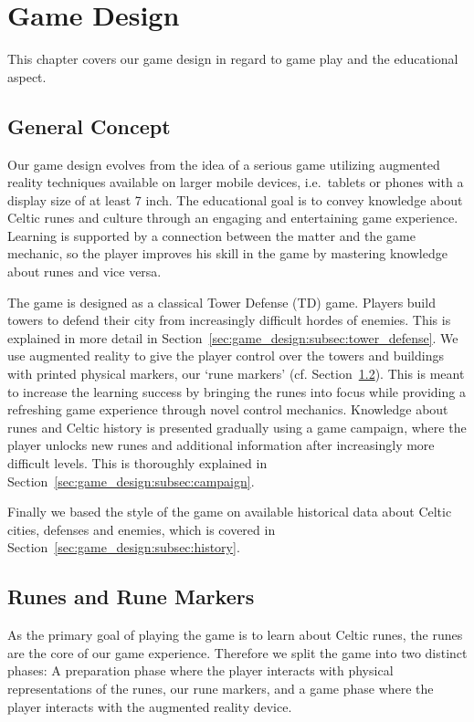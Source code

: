 \section{Game Design}
\label{sec:game_design}

This chapter covers our game design in regard to game play and the educational aspect.

\subsection{General Concept}
\label{sec:game_design:subsec:general_concept}

Our game design evolves from the idea of a serious game utilizing augmented reality techniques available on larger mobile devices, i.e.\ tablets or phones with a display size of at least 7 inch.
The educational goal is to convey knowledge about Celtic runes and culture through an engaging and entertaining game experience.
Learning is supported by a connection between the matter and the game mechanic, so the player improves his skill in the game by mastering knowledge about runes and vice versa.

The game is designed as a classical Tower Defense (TD) game. Players build towers to defend their city from increasingly difficult hordes of enemies.
This is explained in more detail in Section~\ref{sec:game_design:subsec:tower_defense}.
We use augmented reality to give the player control over the towers and buildings with printed physical markers, our `rune markers' (cf. Section~\ref{sec:game_design:subsec:runes}).
This is meant to increase the learning success by bringing the runes into focus while providing a refreshing game experience through novel control mechanics.
Knowledge about runes and Celtic history is presented gradually using a game campaign, where the player unlocks new runes and additional information after increasingly more difficult levels. This is thoroughly explained in Section~\ref{sec:game_design:subsec:campaign}.

Finally we based the style of the game on available historical data about Celtic cities, defenses and enemies, which is covered in Section~\ref{sec:game_design:subsec:history}.

\subsection{Runes and Rune Markers}
\label{sec:game_design:subsec:runes}

As the primary goal of playing the game is to learn about Celtic runes, the runes are the core of our game experience.
Therefore we split the game into two distinct phases:
A preparation phase where the player interacts with physical representations of the runes, our rune markers, and a game phase where the player interacts with the augmented reality device.

